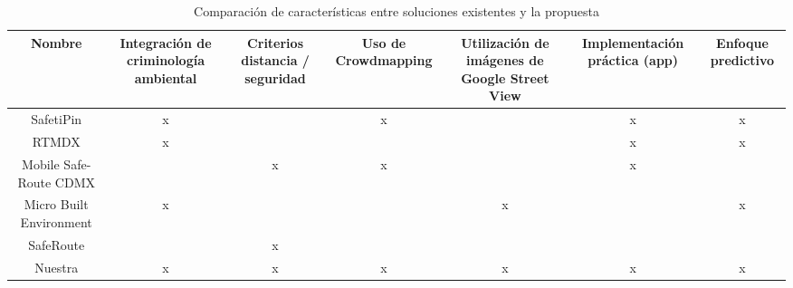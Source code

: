 \begin{table}[htbp]
\centering
\footnotesize
\caption{Comparación de características entre soluciones existentes y la propuesta}
\label{tab:tabla-comparativa}
\begin{tabularx}{\textwidth}{ |C|C|C|C|C|C|C| }
\hline
\textbf{Nombre} & \textbf{Integración de criminología ambiental} & \textbf{Criterios distancia / seguridad} & \textbf{Uso de Crowdmapping} & \textbf{Utilización de imágenes de Google Street View} & \textbf{Implementación práctica (app)} & \textbf{Enfoque predictivo} \\ \hline
SafetiPin & x & & x & & x & x \\ \hline
RTMDX & x & & & & x & x \\ \hline
Mobile Safe-Route CDMX & & x & x & & x & \\ \hline
Micro Built Environment & x & & & x & & x \\ \hline
SafeRoute & & x & & & & \\ \hline
Nuestra & x & x & x & x & x & x \\ \hline
\end{tabularx}
\end{table}
